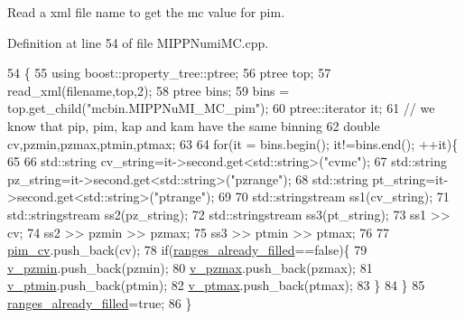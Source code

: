 Read a xml file name to get the mc value for pim. 



Definition at line 54 of file M\-I\-P\-P\-Numi\-M\-C.\-cpp.


\begin{DoxyCode}
54                                                     \{
55     \textcolor{keyword}{using} boost::property\_tree::ptree;
56     ptree top;
57     read\_xml(filename,top,2); 
58     ptree bins;
59     bins = top.get\_child(\textcolor{stringliteral}{"mcbin.MIPPNuMI\_MC\_pim"});
60     ptree::iterator it;    
61     \textcolor{comment}{// we know that pip, pim, kap and kam have the same binning}
62     \textcolor{keywordtype}{double} cv,pzmin,pzmax,ptmin,ptmax;
63     
64     \textcolor{keywordflow}{for}(it = bins.begin(); it!=bins.end(); ++it)\{
65    
66       std::string cv\_string=it->second.get<std::string>(\textcolor{stringliteral}{"cvmc"});
67       std::string pz\_string=it->second.get<std::string>(\textcolor{stringliteral}{"pzrange"});
68       std::string pt\_string=it->second.get<std::string>(\textcolor{stringliteral}{"ptrange"});
69 
70       std::stringstream ss1(cv\_string);
71       std::stringstream ss2(pz\_string);
72       std::stringstream ss3(pt\_string);
73       ss1 >> cv;
74       ss2 >> pzmin >> pzmax;
75       ss3 >> ptmin >> ptmax;
76   
77       \hyperlink{class_neutrino_flux_reweight_1_1_m_i_p_p_numi_m_c_a8aad49a86d53b5188e5287d850b9852d}{pim\_cv}.push\_back(cv);
78       \textcolor{keywordflow}{if}(\hyperlink{class_neutrino_flux_reweight_1_1_m_i_p_p_numi_m_c_a13918556257e6e07eb9c83cb9c029a94}{ranges\_already\_filled}==\textcolor{keyword}{false})\{
79         \hyperlink{class_neutrino_flux_reweight_1_1_m_i_p_p_numi_m_c_af6796ed5716ee06589ab1ba6e09fcd82}{v\_pzmin}.push\_back(pzmin);
80         \hyperlink{class_neutrino_flux_reweight_1_1_m_i_p_p_numi_m_c_ac4e9e478e2456cd112522650850b507c}{v\_pzmax}.push\_back(pzmax);
81         \hyperlink{class_neutrino_flux_reweight_1_1_m_i_p_p_numi_m_c_a105e858db8bf5e6b94a69b196815d98a}{v\_ptmin}.push\_back(ptmin);
82         \hyperlink{class_neutrino_flux_reweight_1_1_m_i_p_p_numi_m_c_afab2e17efd7d42565f3e1c8a84064349}{v\_ptmax}.push\_back(ptmax);
83       \}
84     \}
85     \hyperlink{class_neutrino_flux_reweight_1_1_m_i_p_p_numi_m_c_a13918556257e6e07eb9c83cb9c029a94}{ranges\_already\_filled}=\textcolor{keyword}{true};
86 \}
\end{DoxyCode}
